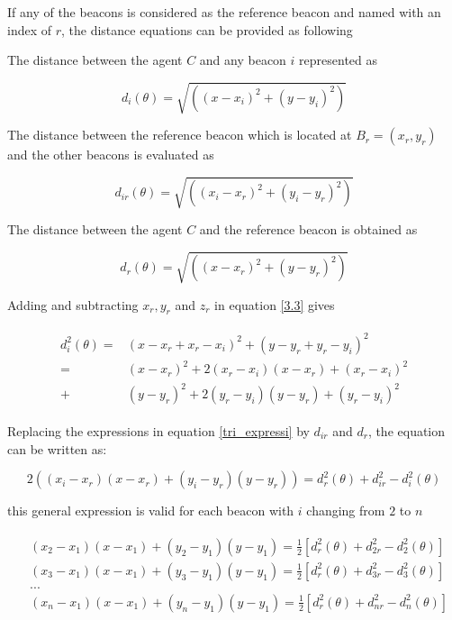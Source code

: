 If any of the beacons is considered as the reference beacon and named with an index of $r$, the distance equations can be provided as following

The distance between the agent $C$ and any beacon $i$ represented as

\begin{equation} \label{3.3}
d_i(\theta) = \sqrt{\left((x - x_i)^2 + (y - y_i)^2\right)}
\end{equation}

The distance between the reference beacon which is located at $B_r = (x_r,y_r)$ and the other beacons is evaluated as

\begin{equation}
d_{ir}(\theta) = \sqrt{\left((x_i - x_r)^2 + (y_i - y_r)^2\right)}
\end{equation}

The distance between the agent $C$ and the reference beacon is obtained as

\begin{equation}
d_r(\theta) = \sqrt{\left((x - x_r)^2 + (y - y_r)^2\right)}
\end{equation}

Adding and subtracting $x_r, y_r$ and $z_r$ in equation \ref{3.3} gives

\begin{align} \label{tri_expressi}
\begin{split}
d_i^2(\theta) = & (x - x_r + x_r - x_i)^2 + (y - y_r + y_r - y_i)^2 \\ 
              = & (x - x_r)^2 + 2(x_r - x_i)(x - x_r) + (x_r-x_i)^2 \\
              + & (y - y_r)^2 + 2(y_r - y_i)(y - y_r) + (y_r - y_i)^2
\end{split}
\end{align}

Replacing the expressions in equation \ref{tri_expressi} by $d_{ir}$ and $d_r$, the equation can be written as:

\begin{equation}
 2((x_i - x_r)(x - x_r) + (y_i - y_r)(y - y_r)) = d_r^2(\theta) + d_{ir}^2 - d_i^2(\theta)
\end{equation}

this general expression is valid for each beacon with $i$ changing from $2$ to $n$

\begin{align}
\begin{split}
& (x_2 - x_1)(x - x_1) + (y_2 - y_1)(y - y_1) = \frac{1}{2} [d_r^2(\theta) + d_{2r}^2 - d_2^2(\theta)] \\
& (x_3 - x_1)(x - x_1) + (y_3 - y_1)(y - y_1) = \frac{1}{2} [d_r^2(\theta) + d_{3r}^2 - d_3^2(\theta)] \\
& ... \\
& (x_n - x_1)(x - x_1) + (y_n - y_1)(y - y_1) = \frac{1}{2} [d_r^2(\theta) + d_{nr}^2 - d_n^2(\theta)]
\end{split}
\end{align}

